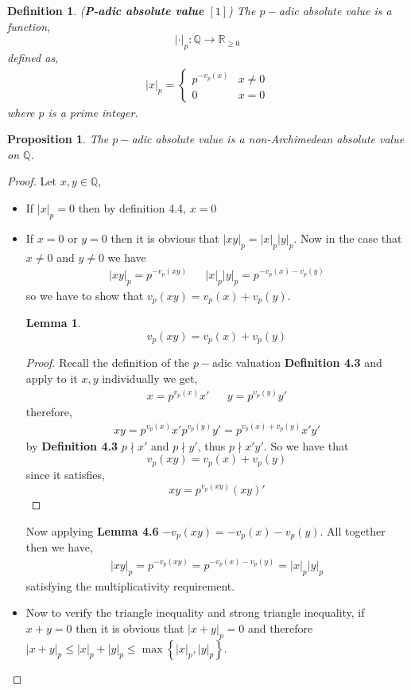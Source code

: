 \documentclass[12pt]{article}
\newtheorem{lem}[thm]{Lemma}
\newtheorem{prop}[thm]{Proposition}
\newtheorem{mydef}[thm]{Definition}
\theoremstyle{definition}
\theoremstyle{remark}
\newcommand{\qq}{\mathbb Q}   %
\newcommand{\rr}{\mathbb R}   %
\newcommand{\abs}[1]{\left\lvert#1\right\rvert} %
\renewcommand{\geq}{\geqslant}
\renewcommand{\leq}{\leqslant}
\newcommand{\lrb}[1]{\left[#1\right]}
\newcommand{\lrc}[1]{\left\{#1\right\}}
\begin{document}
  \begin{mydef}(\textbf{P-adic absolute value} $\lrb{1}$)
    The $p-$adic absolute value is a function,
    \[\abs{\cdot}_p: \qq \to \rr_{\geq 0}\]
    defined as,
    \begin{align*}
      \abs{x}_p = \begin{cases}
        p^{-v_p(x)} & x \neq 0 \\
        0 & x = 0
      \end{cases}
    \end{align*}
    where $p$ is a prime integer. 
  \end{mydef}
    \begin{prop}
      The $p-$adic absolute value is a non-Archimedean absolute value on $\qq$.
    \end{prop}
    \begin{proof} Let $x,y \in \qq$,
      \begin{itemize}
        \item[(1)] If $\abs{x}_p = 0$ then by definition 4.4, $x = 0$
        \item[(2)] If $x = 0$ or $y = 0$ then it is obvious that $\abs{xy}_p = \abs{x}_p\abs{y}_p$. Now in the case that $x \neq 0$ and $y \neq 0$ we have
        \begin{align}
          \abs{xy}_p = p^{-v_p(xy)} && \abs{x}_p\abs{y}_p = p^{-v_p(x) -v_p(y)}
        \end{align} 
        so we have to show that $v_p(xy) = v_p(x) + v_p(y)$.
        \begin{lem}
          \[v_p(xy) = v_p(x) + v_p(y)\]
        \end{lem}
        \begin{proof}
          Recall the definition of the $p-$adic valuation \textbf{Definition 4.3} and apply to it $x,y$ individually we get,
          \begin{align*}
            x = p^{v_p(x)}x' && y = p^{v_p(y)}y'
          \end{align*}
          therefore,
          \begin{align*}
            xy = p^{v_p(x)}x'p^{v_p(y)}y' = p^{v_p(x) + v_p(y)}x'y'
          \end{align*}
          by \textbf{Definition 4.3} $p \nmid x'$ and $p \nmid y'$, thus $p \nmid x'y'$. So we have that \[v_p(xy) = v_p(x) + v_p(y)\] since it satisfies,
          \[xy = p^{v_p(xy)}(xy)'\]
        \end{proof}
        Now applying \textbf{Lemma 4.6} $-v_p(xy) = -v_p(x) -v_p(y)$. All together then we have,
        \begin{align*}
          \abs{xy}_p = p^{-v_p(xy)} = p^{-v_p(x) -v_p(y)} = \abs{x}_p\abs{y}_p
        \end{align*}
        satisfying the multiplicativity requirement. 
        \item[(3)] Now to verify the triangle inequality and strong triangle inequality, if $x + y = 0 $ then it is obvious that $\abs{x + y}_p = 0$ and therefore $\abs{x +y }_p \leq \abs{x}_p + \abs{y}_p \leq \max\lrc{\abs{x}_p, \abs{y}_p}$.
        

\end{itemize}
\end{proof}
\end{document}
